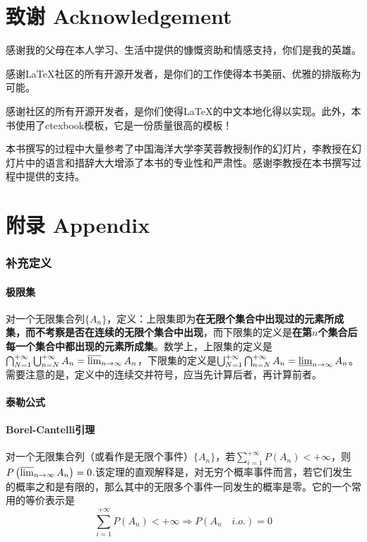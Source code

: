 \documentclass[UTF8]{ctexbook}
\begin{document}
\chapter*{致谢 Acknowledgement}
感谢我的父母在本人学习、生活中提供的慷慨资助和情感支持，你们是我的英雄。

感谢\LaTeX 社区的所有开源开发者，是你们的工作使得本书美丽、优雅的排版称为可能。

感谢\CTeX 社区的所有开源开发者，是你们使得\LaTeX 的中文本地化得以实现。此外，本书使用了ctexbook模板，它是一份质量很高的模板！

本书撰写的过程中大量参考了中国海洋大学李芙蓉教授制作的幻灯片，李教授在幻灯片中的语言和措辞大大增添了本书的专业性和严肃性。感谢李教授在本书撰写过程中提供的支持。
\chapter*{附录 Appendix}
\subsection{补充定义}
\subsubsection{极限集}
对一个无限集合列$\{A_n\}$，定义：上限集即为\textbf{在无限个集合中出现过的元素所成集，而不考察是否在连续的无限个集合中出现}，而下限集的定义是\textbf{在第$n$个集合后每一个集合中都出现的元素所成集}。数学上，上限集的定义是$\bigcap_{N=1}^{+\infty}\bigcup_{n=N}^{+\infty}A_n=\varlimsup_{n\to\infty}A_n$，下限集的定义是$\bigcup_{N=1}^{+\infty}\bigcap_{n=N}^{+\infty}A_n=\varliminf_{n\to\infty}A_n$。需要注意的是，定义中的连续交并符号，应当先计算后者，再计算前者。
\subsubsection{泰勒公式}
\label{taylors-theorem}

\subsubsection{Borel-Cantelli引理}
\label{borel-cantelli-lemma}
对一个无限集合列（或看作是无限个事件）$\{A_n\}$，若$\sum_{i=1}^{+\infty}P(A_n)<+\infty$，则$P\left(\varlimsup_{n\to\infty}A_n\right)=0$.该定理的直观解释是，对无穷个概率事件而言，若它们发生的概率之和是有限的，那么其中的无限多个事件一同发生的概率是零。它的一个常用的等价表示是
\[
	\sum_{i=1}^{+\infty}P(A_n)<+\infty\Longrightarrow P(A_n\quad i.o.)=0
\]
\end{document}

